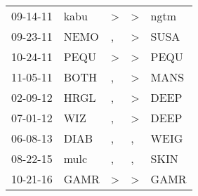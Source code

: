 \begin{supertabular}{lllll}
 09-14-11 &  kabu &  \textgreater &  \textgreater &  ngtm \\
 09-23-11 &  NEMO &             , &  \textgreater &  SUSA \\
 10-24-11 &  PEQU &  \textgreater &  \textgreater &  PEQU \\
 11-05-11 &  BOTH &             , &  \textgreater &  MANS \\
 02-09-12 &  HRGL &             , &  \textgreater &  DEEP \\
 07-01-12 &   WIZ &             , &  \textgreater &  DEEP \\
 06-08-13 &  DIAB &             , &             , &  WEIG \\
 08-22-15 &  mulc &             , &             , &  SKIN \\
 10-21-16 &  GAMR &  \textgreater &  \textgreater &  GAMR \\
\end{supertabular}
